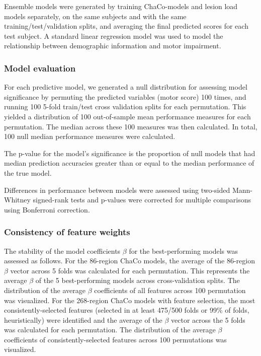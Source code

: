 \documentclass[10pt]{article}
\begin{document}
Ensemble models were generated by training ChaCo-models and lesion load models separately, on the same subjects and with the same training/test/validation splits, and averaging the final predicted scores for each test subject. A standard linear regression model was used to model the relationship between demographic information and motor impairment. 

\subsubsection*{Model evaluation}
For each predictive model, we generated a null distribution for assessing model significance by permuting the predicted variables (motor score) 100 times, and running 100 5-fold train/test cross validation splits for each permutation. This yielded a distribution of 100 out-of-sample mean performance measures for each permutation. The median across these 100 measures was then calculated. In total, 100 null median performance measures were calculated. 

The p-value for the model's significance is the proportion of null models that had median prediction accuracies greater than or equal to the median performance of the true model. 

Differences in performance between models were assessed using two-sided Mann-Whitney signed-rank tests and p-values were corrected for multiple comparisons using Bonferroni correction. 

\subsubsection*{Consistency of feature weights}
The stability of the model coefficients $\beta$ for the best-performing models was assessed as follows. For the 86-region ChaCo models, the average of the 86-region $\beta$ vector across 5 folds was calculated for each permutation. This represents the average $\beta$ of the 5 best-performing models across cross-validation splits. The distribution of the average $\beta$ coefficients of all features across 100 permutation was visualized. For the 268-region ChaCo models with feature selection, the most consistently-selected features (selected in at least 475/500 folds or 99$\%$ of folds, heuristically) were identified and the average of the $\beta$ vector across the 5 folds was calculated for each permutation. The distribution of the average $\beta$ coefficients of consistently-selected features across 100 permutations was visualized. 
\end{document}

